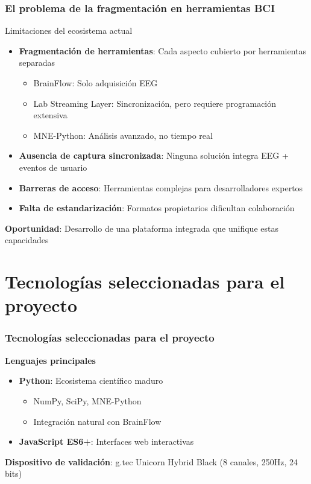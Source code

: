 \documentclass[10pt,thmsa]{beamer}
\theoremstyle{plain}
\begin{document}
\begin{frame}
\frametitle{El problema de la fragmentación en herramientas BCI}

\begin{block}{Limitaciones del ecosistema actual}
\begin{itemize}
\item \textbf{Fragmentación de herramientas}: Cada aspecto cubierto por herramientas separadas
      \begin{itemize}
      \item BrainFlow: Solo adquisición EEG
      \item Lab Streaming Layer: Sincronización, pero requiere programación extensiva
      \item MNE-Python: Análisis avanzado, no tiempo real
      \end{itemize}
\vspace{0.5em}
\item \textbf{Ausencia de captura sincronizada}: Ninguna solución integra EEG + eventos de usuario
\vspace{0.5em}
\item \textbf{Barreras de acceso}: Herramientas complejas para desarrolladores expertos
\vspace{0.5em}
\item \textbf{Falta de estandarización}: Formatos propietarios dificultan colaboración
\end{itemize}
\end{block}

\vspace{0.5em}
\textbf{Oportunidad}: Desarrollo de una plataforma integrada que unifique estas capacidades

\end{frame}

\section{Tecnologías seleccionadas para el proyecto}

\begin{frame}
\frametitle{Tecnologías seleccionadas para el proyecto}

\textbf{Lenguajes principales}
\begin{itemize}
\item \textbf{Python}: Ecosistema científico maduro
      \begin{itemize}
      \item NumPy, SciPy, MNE-Python
      \item Integración natural con BrainFlow
      \end{itemize}
\item \textbf{JavaScript ES6+}: Interfaces web interactivas
\end{itemize}

\vspace{1em}
\textbf{Dispositivo de validación}: g.tec Unicorn Hybrid Black (8 canales, 250Hz, 24 bits)

\end{frame}
\end{document}
